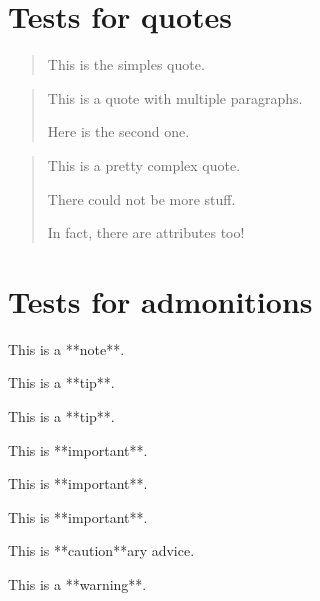 \documentclass{Metanorma}
\begin{document}
  \section{Tests for quotes}

  \begin{quote}
    This is the simples quote.
  \end{quote}

  \begin{quote}
    This is a quote with multiple paragraphs.

    Here is the second one.
  \end{quote}

  \begin{quote}
    This is a pretty complex quote.

    There could not be more stuff.

    In fact, there are attributes too!
  \end{quote}

  \section{Tests for admonitions}

  \begin{note}
    This is a **note**.
  \end{note}

  \begin{tip}
    This is a **tip**.

    This is a **tip**.
  \end{tip}

  \begin{important}
    This is **important**.

    This is **important**.

    This is **important**.
  \end{important}

  \begin{caution}
    This is **caution**ary advice.
  \end{caution}

  \begin{warning}
    This is a **warning**.
  \end{warning}

\end{document}
